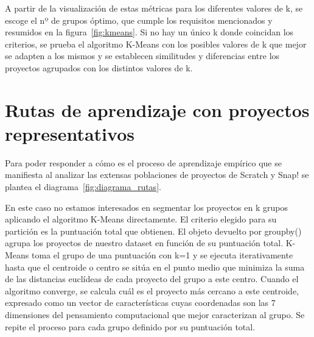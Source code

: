 \documentclass[a4paper, 12pt]{book}
\begin{document}
A partir de la visualización de estas métricas para los diferentes valores de k, se escoge el nº de grupos óptimo, que cumple los requisitos mencionados y resumidos en la figura~\ref{fig:kmeans}. Si no hay un único k donde coincidan los criterios, se prueba el algoritmo K-Means con los posibles valores de k que mejor se adapten a los mismos y se establecen similitudes y diferencias entre los proyectos agrupados con los distintos valores de k.

\section{Rutas de aprendizaje con proyectos representativos}  
\label{sec:rutas_diseño}

Para poder responder a cómo es el proceso de aprendizaje empírico que se manifiesta al analizar las extensas poblaciones de proyectos de Scratch y Snap! se plantea el diagrama~\ref{fig:diagrama_rutas}. 

En este caso no estamos interesados en segmentar los proyectos en k grupos aplicando el algoritmo K-Means directamente. El criterio elegido para su partición es la puntuación total que obtienen. El objeto devuelto por groupby() agrupa los proyectos de nuestro dataset en función de su puntuación total. K-Means toma el grupo de una puntuación con k=1 y se ejecuta iterativamente hasta que el centroide o centro se sitúa en el punto medio que minimiza la suma de las distancias euclídeas de cada proyecto del grupo a este centro. Cuando el algoritmo converge, se calcula cuál es el proyecto más cercano a este centroide, expresado como un vector de características cuyas coordenadas son las 7 dimensiones del pensamiento computacional que mejor caracterizan al grupo. Se repite el proceso para cada grupo definido por su puntuación total.
\end{document}
